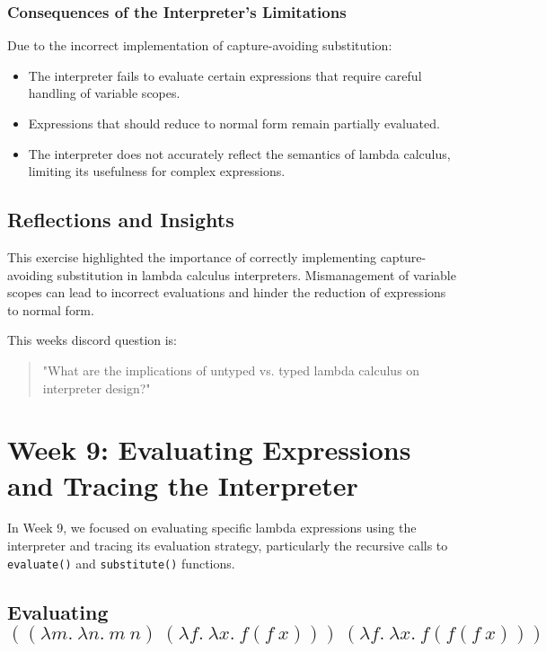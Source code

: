 \documentclass{article}
\begin{document}
\subsubsection*{Consequences of the Interpreter's Limitations}

Due to the incorrect implementation of capture-avoiding substitution:

\begin{itemize}
    \item The interpreter fails to evaluate certain expressions that require careful handling of variable scopes.
    \item Expressions that should reduce to normal form remain partially evaluated.
    \item The interpreter does not accurately reflect the semantics of lambda calculus, limiting its usefulness for complex expressions.
\end{itemize}


\subsection*{Reflections and Insights}

This exercise highlighted the importance of correctly implementing capture-avoiding substitution in lambda calculus interpreters. Mismanagement of variable scopes can lead to incorrect evaluations and hinder the reduction of expressions to normal form.

This weeks discord question is:

\begin{quote}
\small
"What are the implications of untyped vs. typed lambda calculus on interpreter design?"
\end{quote}

\section{Week 9: Evaluating Expressions and Tracing the Interpreter}
\label{sec:week9}

In Week 9, we focused on evaluating specific lambda expressions using the interpreter and tracing its evaluation strategy, particularly the recursive calls to \texttt{evaluate()} and \texttt{substitute()} functions.


\subsection*{Evaluating \(\left((\lambda m.\ \lambda n.\ m\ n)\ (\lambda f.\ \lambda x.\ f(f\ x))\right)\ (\lambda f.\ \lambda x.\ f(f(f\ x)))\)}
\end{document}
